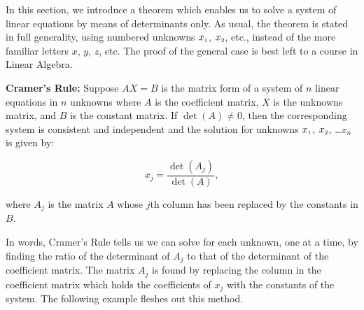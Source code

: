 In this section, we introduce a theorem which enables us to solve a system of linear equations by means of determinants only.  As usual, the theorem is stated in full generality, using numbered unknowns $x_{\mbox{\tiny$1$}}$, $x_{\mbox{\tiny$2$}}$, etc., instead of the more familiar letters $x$, $y$, $z$, etc. The proof of the general case is best left to a course in Linear Algebra.

\smallskip

\colorbox{ResultColor}{\bbm

\begin{thm} \label{CramersRule}  \textbf{Cramer's Rule:} Suppose  $AX = B$ is the matrix form of a system of $n$ linear equations in $n$ unknowns where $A$ is the coefficient matrix, $X$ is the unknowns matrix, and $B$ is the constant matrix.  If $\det(A) \neq 0$, then the corresponding system is consistent and independent and the solution for unknowns $x_{\mbox{\tiny$1$}}$, $x_{\mbox{\tiny$2$}}$, \ldots $x_{n}$ is given by:

\[ x_{j} = \dfrac{\det\left(A_{j}\right)}{\det(A)},\]

where $A_{j}$ is the matrix $A$ whose $j$th column has been replaced by the constants in $B$.

\end{thm}

\ebm}

\smallskip

In words, Cramer's Rule tells us we can solve for each unknown, one at a time, by finding the ratio of the determinant of $A_{j}$ to that of the determinant of the coefficient matrix.  The matrix $A_{j}$ is found by replacing the column in the coefficient matrix which holds the coefficients of $x_{j}$ with the constants of the system.  The following example fleshes out this method.

\smallskip

